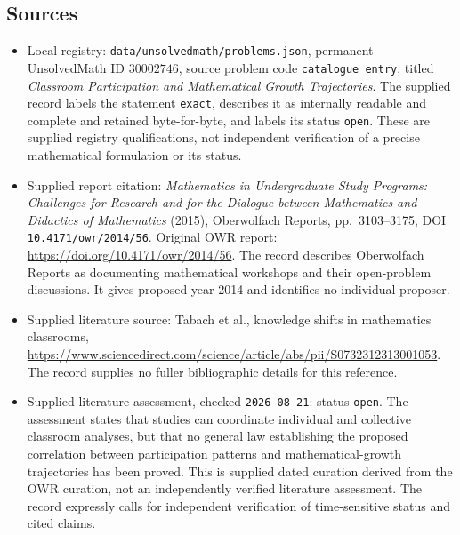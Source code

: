 \documentclass[11pt]{article}
\begin{document}
\subsection{Sources}
\begin{itemize}
\item Local registry: \texttt{data/unsolvedmath/problems.json}, permanent UnsolvedMath ID \(30002746\), source problem code \texttt{catalogue entry}, titled \emph{Classroom Participation and Mathematical Growth Trajectories}. The supplied record labels the statement \texttt{exact}, describes it as internally readable and complete and retained byte-for-byte, and labels its status \texttt{open}. These are supplied registry qualifications, not independent verification of a precise mathematical formulation or its status.
\item Supplied report citation: \emph{Mathematics in Undergraduate Study Programs: Challenges for Research and for the Dialogue between Mathematics and Didactics of Mathematics} (2015), Oberwolfach Reports, pp.\ 3103--3175, DOI \texttt{10.4171/owr/2014/56}. Original OWR report: \url{https://doi.org/10.4171/owr/2014/56}. The record describes Oberwolfach Reports as documenting mathematical workshops and their open-problem discussions. It gives proposed year 2014 and identifies no individual proposer.
\item Supplied literature source: Tabach et al., knowledge shifts in mathematics classrooms, \url{https://www.sciencedirect.com/science/article/abs/pii/S0732312313001053}. The record supplies no fuller bibliographic details for this reference.
\item Supplied literature assessment, checked \texttt{2026-08-21}: status \texttt{open}. The assessment states that studies can coordinate individual and collective classroom analyses, but that no general law establishing the proposed correlation between participation patterns and mathematical-growth trajectories has been proved. This is supplied dated curation derived from the OWR curation, not an independently verified literature assessment. The record expressly calls for independent verification of time-sensitive status and cited claims.
\end{itemize}
\end{document}

